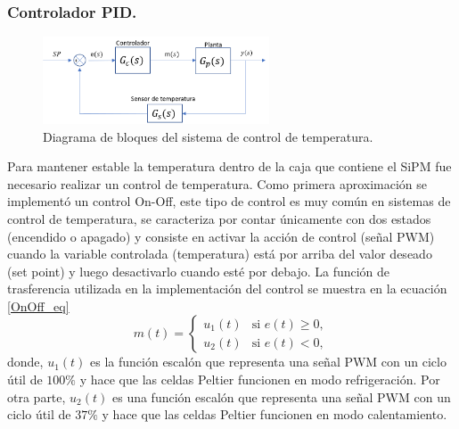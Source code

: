 \subsubsection{Controlador PID.}
\begin{figure}[h!]
\begin{centering}
  \includegraphics[width=0.6\textwidth]{Images/DiagramaOnOff.png}
    \caption{Diagrama de bloques del sistema de control de temperatura.}
    \label{fig:DiagramaOnOff}
  \par\end{centering}
\end{figure}
Para mantener estable la temperatura dentro de la caja que contiene el SiPM fue necesario realizar un control de temperatura. Como primera aproximación se implementó un control On-Off, este tipo de control es muy común en sistemas de control de temperatura, se caracteriza por contar únicamente con dos estados (encendido o apagado) y consiste en activar la acción de control (señal PWM) cuando la variable controlada (temperatura) está por arriba del valor deseado (set point) y luego desactivarlo cuando esté por debajo. La función de trasferencia utilizada en la implementación del control se muestra en la ecuación \ref{OnOff_eq} 
\begin{equation}
  m(t) = \left \{ \begin{matrix} u_{1}(t) & \mbox{si }e(t) \ge 0,
\\u_{2}(t) & \mbox{si }e(t) < 0, \end{matrix}\right.
\label{OnOff_eq}
\end{equation}
donde, $u_{1}(t)$ es la función escalón que representa una señal PWM con un ciclo útil de $100\%$ y hace que las celdas Peltier funcionen en modo refrigeración. Por otra parte, $u_{2}(t)$ es una función escalón que representa una señal PWM con un ciclo útil de $37\%$ y hace que las celdas Peltier funcionen en modo calentamiento. 
